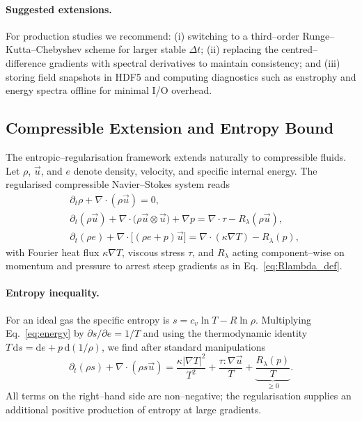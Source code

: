\documentclass[12pt]{report}
\newcommand{\dd}{\mathrm{d}}
\begin{document}
\paragraph{Suggested extensions.}  For production studies we recommend: (i) switching to a third--order Runge--Kutta--Chebyshev scheme for larger stable $\Delta t$; (ii) replacing the centred--difference gradients with spectral derivatives to maintain consistency; and (iii) storing field snapshots in HDF5 and computing diagnostics such as enstrophy and energy spectra offline for minimal I/O overhead.

\subsection{Compressible Extension and Entropy Bound}\label{subsec:compressible}
The entropic--regularisation framework extends naturally to compressible fluids.  Let $\rho$, $\vec{u}$, and $e$ denote density, velocity, and specific internal energy.  The regularised compressible Navier--Stokes system reads
\begin{align}
    &\partial_t \rho + \nabla\!\cdot(\rho\vec{u}) = 0, \label{eq:mass}\\[4pt]
    &\partial_t(\rho\vec{u}) + \nabla\!\cdot\bigl(\rho\vec{u}\otimes\vec{u}\bigr) + \nabla p = \nabla\!\cdot\tau - R_\lambda(\rho\vec{u}), \label{eq:mom}\\[4pt]
    &\partial_t(\rho e) + \nabla\!\cdot\bigl[(\rho e+p)\vec{u}\bigr] = \nabla\!\cdot(\kappa\nabla T) - R_\lambda(p), \label{eq:energy}
\end{align}
with Fourier heat flux $\kappa\nabla T$, viscous stress $\tau$, and $R_\lambda$ acting component--wise on momentum and pressure to arrest steep gradients as in Eq.~\eqref{eq:Rlambda_def}.

\paragraph{Entropy inequality.}  For an ideal gas the specific entropy is $s = c_v\ln T - R\ln \rho$.  Multiplying Eq.~\eqref{eq:energy} by $\partial s/\partial e = 1/T$ and using the thermodynamic identity $T\,\dd s = \dd e + p\,\dd(1/\rho)$, we find after standard manipulations
\begin{equation}\label{eq:entropy_balance}
    \partial_t(\rho s) + \nabla\!\cdot(\rho s\vec{u}) = \frac{\kappa|\nabla T|^2}{T^2} + \frac{\tau{:}\nabla\vec{u}}{T} + \underbrace{\frac{R_\lambda(p)}{T}}_{\displaystyle \ge 0}.
\end{equation}
All terms on the right--hand side are non--negative; the regularisation supplies an additional positive production of entropy at large gradients.
\end{document}
